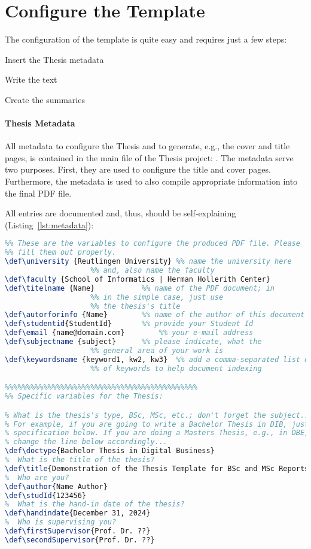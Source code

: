\section{Configure the Template}
\label{sec:2:ConfigureTheTemplate}
The configuration of the template is quite easy and requires just a few steps:
\begin{compactenum}
	\item Insert the Thesis metadata
	\item Write the text
	\item Create the summaries
\end{compactenum}

\paragraph{Thesis Metadata}
All metadata to configure the Thesis and to generate, e.g., the cover and title pages, is contained in the main file of the Thesis project: . The metadata serve two purposes. First, they are used to configure the title and cover pages. Furthermore, the metadata is used to also compile appropriate information into the final PDF file.

All entries are documented and, thus, should be self-explaining (Listing~\ref{lst:metadata}):

\begin{lstlisting}[captionpos=b, language=TeX, commentstyle=\color{blue}\itshape, caption=Metadata for the Thesis (PDF and document information),label=lst:metadata]
%%%%%%%%%%%%%%%%%%%%%%%%%%%%%%%%%%%%%%%%%%%%%
%% These are the variables to configure the produced PDF file. Please
%% fill them out properly.
\def\university {Reutlingen University}	%% name the university here
					%% and, also name the faculty
\def\faculty {School of Informatics | Herman Hollerith Center}	
\def\titelname {Name}			%% name of the PDF document; in
					%% in the simple case, just use
					%% the thesis's title
\def\autorforinfo {Name}		%% name of the author of this document
\def\studentid{StudentId}		%% provide your Student Id
\def\email {name@domain.com}		%% your e-mail address
\def\subjectname {subject}		%% please indicate, what the
					%% general area of your work is
\def\keywordsname {keyword1, kw2, kw3}	%% add a comma-separated list of
					%% of keywords to help document indexing

%%%%%%%%%%%%%%%%%%%%%%%%%%%%%%%%%%%%%%%%%%%%%
%% Specific variables for the Thesis:

% What is the thesis's type, BSc, MSc, etc.; don't forget the subject...
% For example, if you are going to write a Bachelor Thesis in DIB, just use the 
% specification below. If you are doing a Masters Thesis, e.g., in DBE, just 
% change the line below accordingly...
\def\doctype{Bachelor Thesis in Digital Business}
%  What is the title of the thesis?
\def\title{Demonstration of the Thesis Template for BSc and MSc Reports}
%  Who are you?
\def\author{Name Author}
\def\studId{123456}
%  What is the hand-in date of the thesis?
\def\handindate{December 31, 2024}
%  Who is supervising you?
\def\firstSupervisor{Prof. Dr. ??}
\def\secondSupervisor{Prof. Dr. ??}
 
\end{lstlisting}

